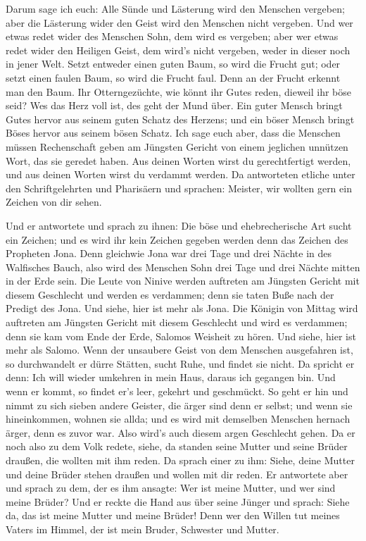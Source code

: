  Darum sage ich euch: Alle Sünde und Lästerung wird den
Menschen vergeben; aber die Lästerung wider den Geist wird den Menschen
nicht vergeben.  Und wer etwas redet wider des Menschen
Sohn, dem wird es vergeben; aber wer etwas redet wider den Heiligen
Geist, dem wird's nicht vergeben, weder in dieser noch in jener Welt.
 Setzt entweder einen guten Baum, so wird die Frucht gut;
oder setzt einen faulen Baum, so wird die Frucht faul. Denn an der
Frucht erkennt man den Baum.  Ihr Otterngezüchte, wie
könnt ihr Gutes reden, dieweil ihr böse seid? Wes das Herz voll ist, des
geht der Mund über.  Ein guter Mensch bringt Gutes hervor
aus seinem guten Schatz des Herzens; und ein böser Mensch bringt Böses
hervor aus seinem bösen Schatz.  Ich sage euch aber, dass
die Menschen müssen Rechenschaft geben am Jüngsten Gericht von einem
jeglichen unnützen Wort, das sie geredet haben.  Aus
deinen Worten wirst du gerechtfertigt werden, und aus deinen Worten
wirst du verdammt werden.  Da antworteten etliche unter
den Schriftgelehrten und Pharisäern und sprachen: Meister, wir wollten
gern ein Zeichen von dir sehen.

 Und er antwortete und sprach zu ihnen: Die böse und
ehebrecherische Art sucht ein Zeichen; und es wird ihr kein Zeichen
gegeben werden denn das Zeichen des Propheten Jona.  Denn
gleichwie Jona war drei Tage und drei Nächte in des Walfisches Bauch,
also wird des Menschen Sohn drei Tage und drei Nächte mitten in der Erde
sein.  Die Leute von Ninive werden auftreten am Jüngsten
Gericht mit diesem Geschlecht und werden es verdammen; denn sie taten
Buße nach der Predigt des Jona. Und siehe, hier ist mehr als Jona.
 Die Königin von Mittag wird auftreten am Jüngsten
Gericht mit diesem Geschlecht und wird es verdammen; denn sie kam vom
Ende der Erde, Salomos Weisheit zu hören. Und siehe, hier ist mehr als
Salomo.  Wenn der unsaubere Geist von dem Menschen
ausgefahren ist, so durchwandelt er dürre Stätten, sucht Ruhe, und
findet sie nicht.  Da spricht er denn: Ich will wieder
umkehren in mein Haus, daraus ich gegangen bin. Und wenn er kommt, so
findet er's leer, gekehrt und geschmückt.  So geht er hin
und nimmt zu sich sieben andere Geister, die ärger sind denn er selbst;
und wenn sie hineinkommen, wohnen sie allda; und es wird mit demselben
Menschen hernach ärger, denn es zuvor war. Also wird's auch diesem argen
Geschlecht gehen.  Da er noch also zu dem Volk redete,
siehe, da standen seine Mutter und seine Brüder draußen, die wollten mit
ihm reden.  Da sprach einer zu ihm: Siehe, deine Mutter
und deine Brüder stehen draußen und wollen mit dir reden.
 Er antwortete aber und sprach zu dem, der es ihm
ansagte: Wer ist meine Mutter, und wer sind meine Brüder?
 Und er reckte die Hand aus über seine Jünger und sprach:
Siehe da, das ist meine Mutter und meine Brüder!  Denn
wer den Willen tut meines Vaters im Himmel, der ist mein Bruder,
Schwester und Mutter.

